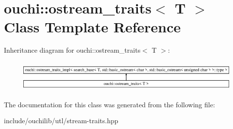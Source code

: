 \hypertarget{classouchi_1_1ostream__traits}{}\section{ouchi\+::ostream\+\_\+traits$<$ T $>$ Class Template Reference}
\label{classouchi_1_1ostream__traits}
Inheritance diagram for ouchi\+::ostream\+\_\+traits$<$ T $>$\+:\begin{figure}[H]
\begin{center}
\leavevmode
\includegraphics[height=1.595442cm]{classouchi_1_1ostream__traits}
\end{center}
\end{figure}


The documentation for this class was generated from the following file\+:\begin{DoxyCompactItemize}
\item 
include/ouchilib/utl/stream-\/traits.\+hpp\end{DoxyCompactItemize}
